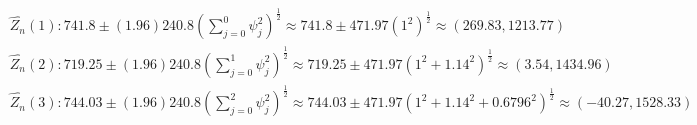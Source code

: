 \documentclass[12pt, letterpaper]{article}
\theoremstyle{definition}
\numberwithin{equation}{section}
\newcommand{\+}[1]{+_{\scalebox{.375}{#1}}}
\newcommand{\1}{\mathbbm{1}}
\begin{document}
\vspace{-0.5cm}
\begin{align*}
	&\widehat{Z_n}(1): 741.8 \pm (1.96)240.8\left(\sum\limits_{j=0}^{0}\psi_j^2\right)^{\frac{1}{2}}\approx741.8 \pm 471.97\left(1^2\right)^{\frac{1}{2}}\approx(269.83, 1213.77)\\
	&\widehat{Z_n}(2): 719.25 \pm (1.96)240.8\left(\sum\limits_{j=0}^{1}\psi_j^2\right)^{\frac{1}{2}}\approx719.25 \pm 471.97\left(1^2+1.14^2\right)^{\frac{1}{2}}\approx (3.54, 1434.96)\\
	&\widehat{Z_n}(3): 744.03 \pm (1.96)240.8\left(\sum\limits_{j=0}^{2}\psi_j^2\right)^{\frac{1}{2}}\approx744.03 \pm 471.97\left(1^2+1.14^2+0.6796^2\right)^{\frac{1}{2}}\approx (-40.27, 1528.33)
\end{align*}
\end{document}
